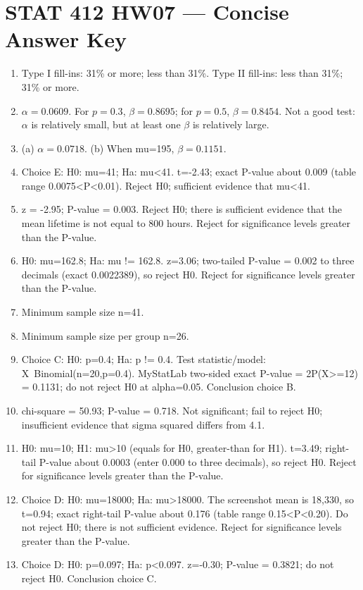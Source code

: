\documentclass[11pt]{article}
\begin{document}
\section*{STAT 412 HW07 --- Concise Answer Key}
\begin{enumerate}[label=\textbf{\arabic*.}]
\item Type I fill-ins: 31\% or more; less than 31\%. Type II fill-ins: less than 31\%; 31\% or more.
\item $\alpha=0.0609$. For $p=0.3$, $\beta=0.8695$; for $p=0.5$, $\beta=0.8454$. Not a good test: $\alpha$ is relatively small, but at least one $\beta$ is relatively large.
\item (a) $\alpha=0.0718$. (b) When mu=195, $\beta=0.1151$.
\item Choice E: H0: mu=41; Ha: mu<41. t=-2.43; exact P-value about 0.009 (table range 0.0075<P<0.01). Reject H0; sufficient evidence that mu<41.
\item z = -2.95; P-value = 0.003. Reject H0; there is sufficient evidence that the mean lifetime is not equal to 800 hours. Reject for significance levels greater than the P-value.
\item H0: mu=162.8; Ha: mu != 162.8. z=3.06; two-tailed P-value = 0.002 to three decimals (exact 0.0022389), so reject H0. Reject for significance levels greater than the P-value.
\item Minimum sample size n=41.
\item Minimum sample size per group n=26.
\item Choice C: H0: p=0.4; Ha: p != 0.4. Test statistic/model: X~Binomial(n=20,p=0.4). MyStatLab two-sided exact P-value = 2P(X>=12) = 0.1131; do not reject H0 at alpha=0.05. Conclusion choice B.
\item chi-square = 50.93; P-value = 0.718. Not significant; fail to reject H0; insufficient evidence that sigma squared differs from 4.1.
\item H0: mu=10; H1: mu>10 (equals for H0, greater-than for H1). t=3.49; right-tail P-value about 0.0003 (enter 0.000 to three decimals), so reject H0. Reject for significance levels greater than the P-value.
\item Choice D: H0: mu=18000; Ha: mu>18000. The screenshot mean is 18,330, so t=0.94; exact right-tail P-value about 0.176 (table range 0.15<P<0.20). Do not reject H0; there is not sufficient evidence. Reject for significance levels greater than the P-value.
\item Choice D: H0: p=0.097; Ha: p<0.097. z=-0.30; P-value = 0.3821; do not reject H0. Conclusion choice C.

\end{enumerate}
\end{document}
